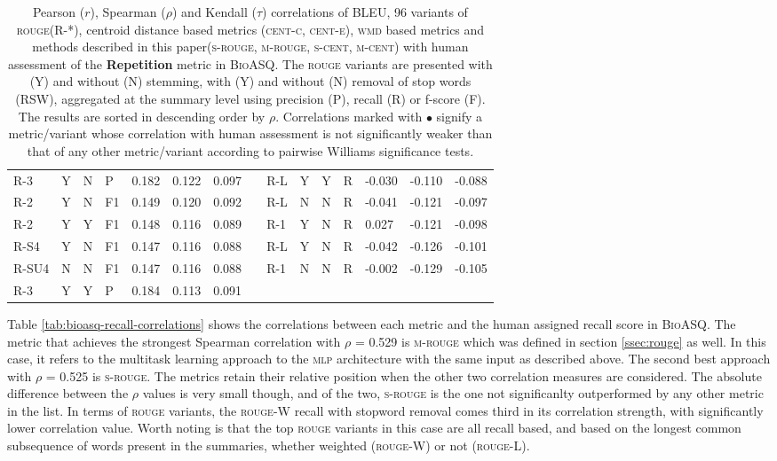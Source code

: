 \documentclass[11pt,a4paper]{article}
\newcommand{\rouge}{\textsc{rouge}\xspace}
\newcommand{\mlp}{\textsc{mlp}\xspace}
\newcommand{\centc}{\textsc{cent-c}\xspace}
\newcommand{\cente}{\textsc{cent-e}\xspace}
\newcommand{\wmd}{\textsc{wmd}\xspace}
\newcommand{\bioasq}{\textsc{BioASQ}\xspace}
\newcommand{\srouge}{\textsc{s-rouge}\xspace}
\newcommand{\mrouge}{\textsc{m-rouge}\xspace}
\newcommand{\scent}{\textsc{s-cent}\xspace}
\newcommand{\mcent}{\textsc{m-cent}\xspace}
\begin{document}
\begin{table}[]
{\begin{tabular}{lllllllllllllll}
\textsc{R-3} & Y & N & P & 0.182 & 0.122 & 0.097 &  & \textsc{R-L} & Y & Y & R & -0.030 & -0.110 & -0.088 \\
\textsc{R-2} & Y & N & F1 & 0.149 & 0.120 & 0.092 &  & \textsc{R-L} & N & N & R & -0.041 & -0.121 & -0.097 \\
\textsc{R-2} & Y & Y & F1 & 0.148 & 0.116 & 0.089 &  & \textsc{R-1} & Y & N & R & 0.027 & -0.121 & -0.098 \\
\textsc{R-S4} & Y & N & F1 & 0.147 & 0.116 & 0.088 &  & \textsc{R-L} & Y & N & R & -0.042 & -0.126 & -0.101 \\
\textsc{R-SU4} & N & N & F1 & 0.147 & 0.116 & 0.088 &  & \textsc{R-1} & N & N & R & -0.002 & -0.129 & -0.105 \\
\textsc{R-3} & Y & Y & P & 0.184 & 0.113 & 0.091 &  &  &  &  &  &  &  &  \\ \hline
\end{tabular}
}
\caption{Pearson ($r$), Spearman ($\rho$) and Kendall ($\tau$) correlations of BLEU, 96 variants 
of \rouge (R-*), centroid distance based metrics (\centc, \cente), \wmd based metrics and 
methods described in this paper(\srouge, \mrouge, \scent, \mcent) with human assessment of the \textbf{Repetition} metric in \bioasq. The \rouge 
variants are presented with (Y) and without (N) stemming, with (Y) and without (N) removal of 
stop words (RSW), aggregated at the summary level using precision (P), recall (R) or f-score (F).
The results are sorted in descending order by $\rho$. Correlations marked with $\bullet$ signify 
a metric/variant whose correlation with human assessment is not significantly weaker than that 
of any other metric/variant according to pairwise Williams significance tests.}
\label{tab:bioasq-repetition-correlations}
\end{table}



Table \ref{tab:bioasq-recall-correlations} shows the correlations between each metric and the human 
assigned recall score in \bioasq. The metric that achieves the strongest Spearman correlation 
with $\rho$ = 0.529 is \mrouge which was defined in section \ref{ssec:rouge} as well. In this case, 
it refers to the multitask learning approach to the \mlp architecture with the same input as 
described above. The second best approach with $\rho$ = 0.525 is \srouge. The metrics retain 
their relative position when the other two correlation measures are considered. The absolute 
difference between the $\rho$ values is very small though, and of the two, \srouge is the one 
not significanlty outperformed by any other metric in the list. In terms of \rouge variants, 
the \rouge-W recall with stopword removal comes third in its correlation strength, with significantly 
lower correlation value. Worth noting is that the top \rouge variants in this case are all 
recall based, and based on the longest common subsequence of words present in the summaries, 
whether weighted (\rouge-W) or not (\rouge-L).
\end{document}
